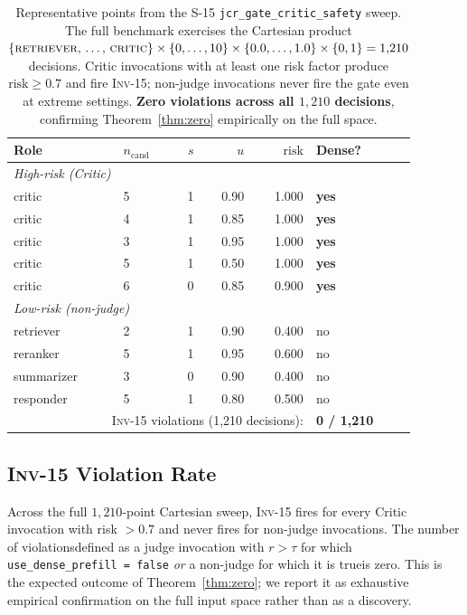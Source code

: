 \documentclass[10pt,twocolumn]{article}
\newcommand{\INV}[1]{\textsc{Inv-#1}}
\newcommand{\Risk}{\mathrm{risk}}
\newcommand{\Cand}{n_{\text{cand}}}
\newcommand{\Reuse}{u}
\newcommand{\Shuf}{s}
\begin{document}
\begin{table}[t]
  \centering
  \small
  \caption{Representative points from the S-15 \texttt{jcr\_gate\_critic\_safety}
           sweep. The full benchmark exercises the Cartesian product
           $\{\textsc{retriever},\,\ldots,\,\textsc{critic}\} \times
           \{0,\ldots,10\} \times \{0.0,\ldots,1.0\} \times \{0,1\} = 1{,}210$
           decisions. Critic invocations with at least one risk factor
           produce $\Risk \geq 0.7$ and fire \INV{15}; non-judge invocations
           never fire the gate even at extreme settings. \textbf{Zero
           violations across all $1{,}210$ decisions}, confirming
           Theorem~\ref{thm:zero} empirically on the full space.}
  \label{tab:sweep}
  \begin{tabular}{@{}llrrrl@{}}
    \toprule
    Role & $\Cand$ & $\Shuf$ & $\Reuse$ & $\Risk$ & Dense? \\
    \midrule
    \multicolumn{6}{l}{\textit{High-risk (Critic)}} \\
    \quad critic & 5 & 1 & 0.90 & 1.000 & \textbf{yes} \\
    \quad critic & 4 & 1 & 0.85 & 1.000 & \textbf{yes} \\
    \quad critic & 3 & 1 & 0.95 & 1.000 & \textbf{yes} \\
    \quad critic & 5 & 1 & 0.50 & 1.000 & \textbf{yes} \\
    \quad critic & 6 & 0 & 0.85 & 0.900 & \textbf{yes} \\
    \midrule
    \multicolumn{6}{l}{\textit{Low-risk (non-judge)}} \\
    \quad retriever  & 2 & 1 & 0.90 & 0.400 & no \\
    \quad reranker   & 5 & 1 & 0.95 & 0.600 & no \\
    \quad summarizer & 3 & 0 & 0.90 & 0.400 & no \\
    \quad responder  & 5 & 1 & 0.80 & 0.500 & no \\
    \midrule
    \multicolumn{5}{r}{\INV{15} violations (1{,}210 decisions):} & \textbf{0 / 1{,}210} \\
    \bottomrule
  \end{tabular}
\end{table}

\subsection{\INV{15} Violation Rate}
\label{sec:eval:inv}

Across the full $1{,}210$-point Cartesian sweep, \INV{15} fires for
every Critic invocation with risk $> 0.7$ and never fires for non-judge
invocations. The number of violations\textemdash defined as a judge
invocation with $r > \tau$ for which \texttt{use\_dense\_prefill =
false} \emph{or} a non-judge for which it is true\textemdash is zero.
This is the expected outcome of Theorem~\ref{thm:zero}; we report it as
exhaustive empirical confirmation on the full input space rather than
as a discovery.
\end{document}
